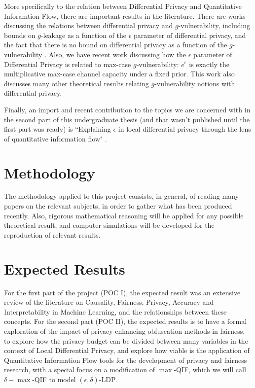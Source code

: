\documentclass{article}
\newcommand{\qm}[1]{``#1"}
\begin{document}
More specifically to the relation between Differential Privacy and Quantitative Inforamtion Flow, there are important results in the literature. There are works discussing the relations between differential privacy and $g$-vulnerability, including bounds on $g$-leakage as a function of the $\epsilon$ parameter of differential privacy, and the fact that there is no bound on differential privacy as a function of the $g$-vulnerability \cite{alvim2015information}. Also, we have recent work \cite{fernandes2022explaining} discussing how the $\epsilon$ parameter of Differential Privacy is related to max-case $g$-vulnerability: $e^\epsilon$ is exactly the multiplicative max-case channel capacity under a fixed prior. This work also discusses many other theoretical results relating $g$-vulnerability notions with differential privacy. 

Finally, an import and recent contribution to the topics we are concerned with in the second part of this undergraduate thesis (and that wasn't published until the first part was ready) is \qm{Explaining $\epsilon$ in local differential privacy through the lens of quantitative information flow} \cite{fernandes2024explaining}.

\section{Methodology}

The methodology applied to this project consists, in general, of reading many papers on the relevant subjects, in order to gather what has been produced recently. Also, rigorous mathematical reasoning will be applied for any possible theoretical result, and computer simulations will be developed for the reproduction of relevant results.

\section{Expected Results}

For the first part of the project (POC I), the expected result was an extensive review of the literature on Causality, Fairness, Privacy, Accuracy and Interpretability in Machine Learning, and the relationships between these concepts. For the second part (POC II), the expected results is to have a formal exploration of the impact of privacy-enhancing obfuscation methods in fairness, to explore how the privacy budget can be divided between many variables in the context of Local Differential Privacy, and explore how viable is the application of Quantitative Information Flow tools for the development of privacy and fairness research, with a special focus on a modification of $\max$-QIF, which we will call $\delta-\max$-QIF to model $(\epsilon,\delta)$-LDP.
\end{document}
